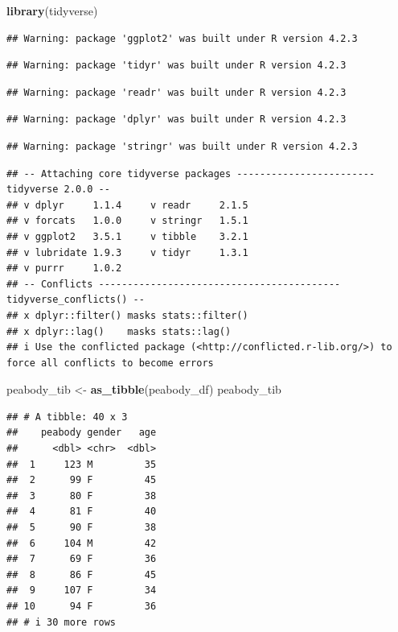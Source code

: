 \documentclass[
]{book}
\newenvironment{Shaded}{\begin{snugshade}}{\end{snugshade}}
\newcommand{\FunctionTok}[1]{\textcolor[rgb]{0.13,0.29,0.53}{\textbf{#1}}}
\newcommand{\NormalTok}[1]{#1}
\newcommand{\OtherTok}[1]{\textcolor[rgb]{0.56,0.35,0.01}{#1}}
\begin{document}
\begin{Shaded}
\begin{Highlighting}[]
\FunctionTok{library}\NormalTok{(tidyverse)}
\end{Highlighting}
\end{Shaded}

\begin{verbatim}
## Warning: package 'ggplot2' was built under R version 4.2.3
\end{verbatim}

\begin{verbatim}
## Warning: package 'tidyr' was built under R version 4.2.3
\end{verbatim}

\begin{verbatim}
## Warning: package 'readr' was built under R version 4.2.3
\end{verbatim}

\begin{verbatim}
## Warning: package 'dplyr' was built under R version 4.2.3
\end{verbatim}

\begin{verbatim}
## Warning: package 'stringr' was built under R version 4.2.3
\end{verbatim}

\begin{verbatim}
## -- Attaching core tidyverse packages ------------------------ tidyverse 2.0.0 --
## v dplyr     1.1.4     v readr     2.1.5
## v forcats   1.0.0     v stringr   1.5.1
## v ggplot2   3.5.1     v tibble    3.2.1
## v lubridate 1.9.3     v tidyr     1.3.1
## v purrr     1.0.2     
## -- Conflicts ------------------------------------------ tidyverse_conflicts() --
## x dplyr::filter() masks stats::filter()
## x dplyr::lag()    masks stats::lag()
## i Use the conflicted package (<http://conflicted.r-lib.org/>) to force all conflicts to become errors
\end{verbatim}

\begin{Shaded}
\begin{Highlighting}[]
\NormalTok{peabody\_tib }\OtherTok{\textless{}{-}} \FunctionTok{as\_tibble}\NormalTok{(peabody\_df)}
\NormalTok{peabody\_tib}
\end{Highlighting}
\end{Shaded}

\begin{verbatim}
## # A tibble: 40 x 3
##    peabody gender   age
##      <dbl> <chr>  <dbl>
##  1     123 M         35
##  2      99 F         45
##  3      80 F         38
##  4      81 F         40
##  5      90 F         38
##  6     104 M         42
##  7      69 F         36
##  8      86 F         45
##  9     107 F         34
## 10      94 F         36
## # i 30 more rows
\end{verbatim}
\end{document}
